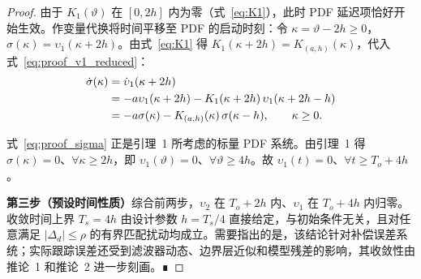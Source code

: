 \documentclass[12pt,a4paper]{article}
\theoremstyle{definition}
\newtheorem{corollary}[theorem]{推论}
\theoremstyle{remark}
\newcommand{\vi}{\upsilon}
\newcommand{\vth}{\vartheta}
\begin{document}
\begin{proof}
由于 $K_1(\vth)$ 在 $[0,2h]$ 内为零（式~\eqref{eq:K1}），此时 PDF 延迟项恰好开始生效。作变量代换将时间平移至 PDF 的启动时刻：令 $\kappa=\vth-2h\ge0$，$\sigma(\kappa)=\vi_1(\kappa+2h)$。由式~\eqref{eq:K1} 得 $K_1(\kappa+2h)=K_{(a,h)}(\kappa)$，代入式~\eqref{eq:proof_v1_reduced}：
\begin{align}
  \dot\sigma(\kappa) &= \dot\vi_1(\kappa+2h) \notag\\
  &= -a\vi_1(\kappa+2h)-K_1(\kappa+2h)\,\vi_1(\kappa+2h-h) \notag\\
  &= -a\sigma(\kappa)-K_{(a,h)}(\kappa)\,\sigma(\kappa-h), \qquad \kappa\ge 0 . \label{eq:proof_sigma}
\end{align}

式~\eqref{eq:proof_sigma} 正是引理~1 所考虑的标量 PDF 系统。由引理~1 得 $\sigma(\kappa)=0$、$\forall\kappa\ge 2h$，即 $\vi_1(\vth)=0$、$\forall\vth\ge 4h$。故 $\vi_1(t)=0$、$\forall t\ge T_o+4h$。

\textbf{第三步（预设时间性质）}综合前两步，$\vi_2$ 在 $T_o+2h$ 内、$\vi_1$ 在 $T_o+4h$ 内归零。收敛时间上界 $T_s=4h$ 由设计参数 $h=T_s/4$ 直接给定，与初始条件无关，且对任意满足 $|\Delta_d|\le\rho$ 的有界匹配扰动均成立。需要指出的是，该结论针对补偿误差系统；实际跟踪误差还受到滤波器动态、边界层近似和模型残差的影响，其收敛性由推论~1 和推论~2 进一步刻画。∎
\end{proof}



\end{document}
